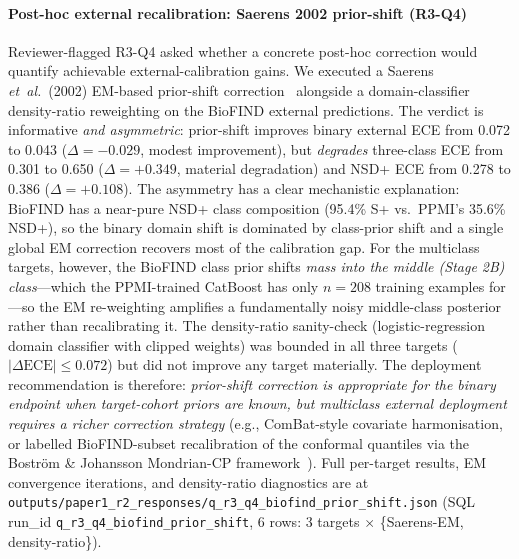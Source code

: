 \documentclass[10pt,letterpaper]{article}
\begin{document}
\paragraph*{Post-hoc external recalibration: Saerens 2002 prior-shift (R3-Q4)} Reviewer-flagged R3-Q4 asked whether a concrete post-hoc correction would quantify achievable external-calibration gains. We executed a Saerens \textit{et~al.}~(2002) EM-based prior-shift correction~\cite{saerens2002priorshift} alongside a domain-classifier density-ratio reweighting on the BioFIND external predictions. The verdict is informative \emph{and asymmetric}: prior-shift improves binary external ECE from 0.072 to 0.043 ($\Delta{=}{-}0.029$, modest improvement), but \emph{degrades} three-class ECE from 0.301 to 0.650 ($\Delta{=}{+}0.349$, material degradation) and NSD+ ECE from 0.278 to 0.386 ($\Delta{=}{+}0.108$). The asymmetry has a clear mechanistic explanation: BioFIND has a near-pure NSD+ class composition (95.4\% S+ vs.\ PPMI's 35.6\% NSD+), so the binary domain shift is dominated by class-prior shift and a single global EM correction recovers most of the calibration gap. For the multiclass targets, however, the BioFIND class prior shifts \emph{mass into the middle (Stage 2B) class}---which the PPMI-trained CatBoost has only $n{=}208$ training examples for---so the EM re-weighting amplifies a fundamentally noisy middle-class posterior rather than recalibrating it. The density-ratio sanity-check (logistic-regression domain classifier with clipped weights) was bounded in all three targets ($|\Delta\text{ECE}| \leq 0.072$) but did not improve any target materially. The deployment recommendation is therefore: \emph{prior-shift correction is appropriate for the binary endpoint when target-cohort priors are known, but multiclass external deployment requires a richer correction strategy} (e.g., ComBat-style covariate harmonisation, or labelled BioFIND-subset recalibration of the conformal quantiles via the Bostr\"{o}m \& Johansson Mondrian-CP framework~\cite{bostrom2025mondrian}). Full per-target results, EM convergence iterations, and density-ratio diagnostics are at \texttt{outputs/paper1\_r2\_responses/q\_r3\_q4\_biofind\_prior\_shift.json} (SQL run\_id \texttt{q\_r3\_q4\_biofind\_prior\_shift}, 6 rows: 3 targets $\times$ \{Saerens-EM, density-ratio\}).
\end{document}
